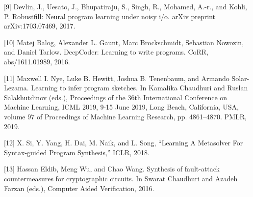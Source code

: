[9] Devlin, J., Uesato, J., Bhupatiraju, S., Singh, R., Mohamed,
A.-r., and Kohli, P. Robustfill: Neural program learning
under noisy i/o. arXiv preprint arXiv:1703.07469, 2017.

[10] Matej Balog, Alexander L. Gaunt, Marc Brockschmidt, Sebastian
Nowozin, and Daniel Tarlow. DeepCoder: Learning to write programs.
CoRR, abs/1611.01989, 2016.

[11] Maxwell I. Nye, Luke B. Hewitt, Joshua B. Tenenbaum, and Armando Solar-Lezama. Learning to
infer program sketches. In Kamalika Chaudhuri and Ruslan Salakhutdinov (eds.), Proceedings
of the 36th International Conference on Machine Learning, ICML 2019, 9-15 June 2019, Long
Beach, California, USA, volume 97 of Proceedings of Machine Learning Research, pp. 4861–4870.
PMLR, 2019.

[12] X. Si, Y. Yang, H. Dai, M. Naik, and L. Song, “Learning A Metasolver For Syntax-guided Program Synthesis,” ICLR, 2018.

[13] Hassan Eldib, Meng Wu, and Chao Wang. Synthesis of fault-attack countermeasures for cryptographic circuits. In Swarat Chaudhuri and Azadeh Farzan (eds.), Computer Aided Verification, 2016.

